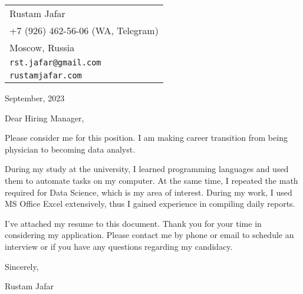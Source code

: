 \documentclass[12pt,a4paper]{article}
\begin{document}
\hspace{2em}
\begin{tabular}{@{}l}
    Rustam Jafar \\
    +7 (926) 462-56-06 (WA, Telegram) \\
    Moscow, Russia \\
    \texttt{rst.jafar@gmail.com} \\
    \texttt{rustamjafar.com}
\end{tabular} \par
    \vspace{15pt}
    September, 2023 \par
    \vspace{15pt}
    Dear Hiring Manager, \par
    \vspace{15pt}
    Please consider me for this position. I am making career transition from 
    being physician to becoming data analyst. \par
    \vspace{15pt}
    During my study at the university, I learned programming languages and used 
    them to automate tasks on my computer. At the same time, I repeated 
    the math required for Data Science, which is my area of interest. 
    During my work, I used MS Office Excel extensively, thus I gained
    experience in compiling daily reports. \par
    \vspace{15pt}
    I've attached my resume to this document.
    Thank you for your time in considering my application. 
    Please contact me by phone or email to schedule an interview or 
    if you have any questions regarding my candidacy. \par
    \vspace{15pt}
    Sincerely, \par
    \vspace{15pt}
    Rustam Jafar
\end{document}
